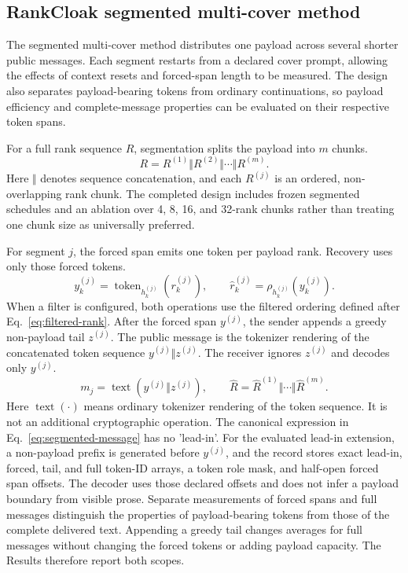 \documentclass[fleqn,10pt]{wlscirep}
\begin{document}
\subsection*{RankCloak segmented multi-cover method}\label{sec:encoding-method}

The segmented multi-cover method distributes one payload across several shorter public messages. Each segment restarts from a declared cover prompt, allowing the effects of context resets and forced-span length to be measured. The design also separates payload-bearing tokens from ordinary continuations, so payload efficiency and complete-message properties can be evaluated on their respective token spans.

For a full rank sequence \(R\), segmentation splits the payload into \(m\) chunks.
\begin{equation}
R = R^{(1)}\Vert R^{(2)}\Vert \cdots \Vert R^{(m)}.
\label{eq:rank-segmentation}
\end{equation}
Here \(\Vert\) denotes sequence concatenation, and each \(R^{(j)}\) is an ordered, non-overlapping rank chunk. The completed design includes frozen segmented schedules and an ablation over 4, 8, 16, and 32-rank chunks rather than treating one chunk size as universally preferred.

For segment \(j\), the forced span emits one token per payload rank. Recovery uses only those forced tokens.
\begin{equation}
y^{(j)}_k=
\operatorname{token}_{h^{(j)}_k}\left(r^{(j)}_k\right),
\qquad
\hat r^{(j)}_k=
\rho_{h^{(j)}_k}\left(y^{(j)}_k\right).
\label{eq:segmented-forced-span}
\end{equation}
When a filter is configured, both operations use the filtered ordering defined after Eq.~\eqref{eq:filtered-rank}. After the forced span \(y^{(j)}\), the sender appends a greedy non-payload tail \(z^{(j)}\). The public message is the tokenizer rendering of the concatenated token sequence \(y^{(j)}\Vert z^{(j)}\). The receiver ignores \(z^{(j)}\) and decodes only \(y^{(j)}\).
\begin{equation}
m_j=\operatorname{text}\left(y^{(j)}\Vert z^{(j)}\right),
\qquad
\hat R=\hat R^{(1)}\Vert\cdots\Vert\hat R^{(m)}.
\label{eq:segmented-message}
\end{equation}
Here \(\operatorname{text}(\cdot)\) means ordinary tokenizer rendering of the token sequence. It is not an additional cryptographic operation. The canonical expression in Eq.~\eqref{eq:segmented-message} has no 'lead-in'. For the evaluated lead-in extension, a non-payload prefix is generated before \(y^{(j)}\), and the record stores exact lead-in, forced, tail, and full token-ID arrays, a token role mask, and half-open forced span offsets. The decoder uses those declared offsets and does not infer a payload boundary from visible prose.
Separate measurements of forced spans and full messages distinguish the properties of payload-bearing tokens from those of the complete delivered text. Appending a greedy tail changes averages for full messages without changing the forced tokens or adding payload capacity. The Results therefore report both scopes.
\end{document}
